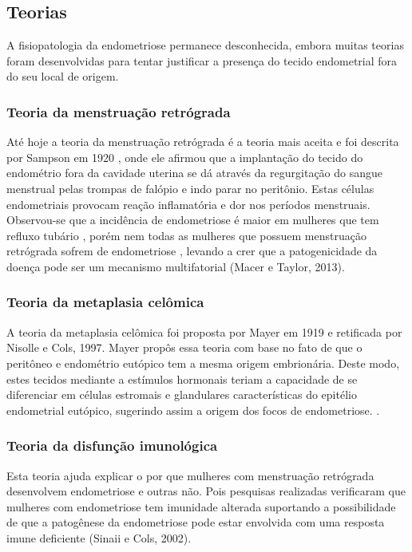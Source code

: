 \documentclass[12pt]{article} %
\begin{document}
\subsection{Teorias}


A fisiopatologia da endometriose permanece desconhecida, embora muitas teorias foram desenvolvidas para tentar justificar a presença do tecido endometrial fora do seu local de origem.

\subsubsection{Teoria da menstruação retrógrada}


Até hoje a teoria da menstruação retrógrada é a teoria mais aceita e foi descrita por Sampson em 1920 , onde ele afirmou que a implantação do tecido do endométrio fora da cavidade uterina se dá através da regurgitação do sangue menstrual pelas trompas de falópio e indo parar no peritônio. Estas células endometriais provocam reação inflamatória e dor nos períodos menstruais. Observou-se que a incidência de endometriose é maior em mulheres que tem refluxo tubário , porém nem todas as mulheres que possuem menstruação retrógrada sofrem de endometriose , levando a crer que a patogenicidade da doença pode ser um mecanismo multifatorial (Macer e Taylor, 2013).

\subsubsection{Teoria da metaplasia celômica}

A teoria da metaplasia celômica foi proposta por Mayer em 1919 e retificada por Nisolle e Cols, 1997. Mayer propôs essa teoria com base no fato de que o peritôneo e endométrio eutópico tem a mesma origem embrionária. Deste modo, estes tecidos mediante a estímulos hormonais teriam a capacidade de se diferenciar em células estromais e glandulares características do epitélio endometrial eutópico, sugerindo assim a origem dos focos de endometriose.
.

\subsubsection{Teoria da disfunção imunológica}

Esta teoria ajuda explicar o por que mulheres com menstruação retrógrada desenvolvem endometriose e outras não. Pois pesquisas realizadas verificaram que mulheres com endometriose tem imunidade alterada suportando a possibilidade de que a patogênese da endometriose pode estar envolvida com uma resposta imune deficiente (Sinaii e Cols, 2002).
\end{document}
